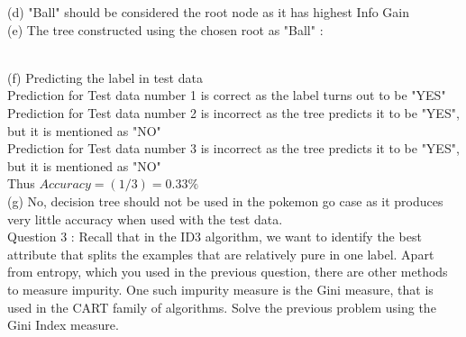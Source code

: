 \documentclass{article}
\begin{document}
(d) "Ball" should be considered the root node as it has highest Info Gain
\\[10pt]
(e) The tree constructed using the chosen root as "Ball" :
\\[10pt]
\nodeDist=22mm
\\[10pt]
(f) Predicting the label in test data
\\[10pt]
Prediction for Test data number 1 is correct as the label turns out to be "YES"
\\Prediction for Test data number 2 is incorrect as the tree predicts it to be "YES", but it is mentioned as "NO"
\\Prediction for Test data number 3 is incorrect as the tree predicts it to be "YES", but it is mentioned as "NO"
\\
Thus $Accuracy = (1/3) = 0.33 \%$ 
\\[10pt]
(g) No, decision tree should not be used in the pokemon go case as it produces very little accuracy when used with the test data.
\\[10pt]
Question 3 : Recall that in the ID3 algorithm, we want to identify the best attribute that splits the examples that are relatively pure in one label. Apart from entropy, which you used in the previous question, there are other methods to measure impurity. One such impurity measure is the Gini measure, that is used in the CART family of algorithms. Solve the previous problem using the Gini Index measure.
\end{document}
